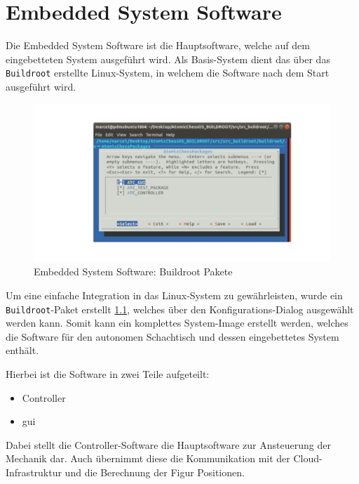 \hypertarget{embedded-system-software}{%
\chapter{Embedded System Software}\label{embedded-system-software}}

Die Embedded System Software ist die Hauptsoftware, welche auf dem
eingebetteten System ausgeführt wird. Als Basis-System dient das über
das \passthrough{\lstinline!Buildroot!} erstellte Linux-System, in
welchem die Software nach dem Start ausgeführt wird.

\begin{figure}
\centering
\includegraphics{images/buildroot_packages_1.png}
\caption{Embedded System Software: Buildroot Pakete
\label{buildroot_packages_1}}
\end{figure}

Um eine einfache Integration in das Linux-System zu gewährleisten, wurde
ein \passthrough{\lstinline!Buildroot!}-Paket erstellt
\ref{buildroot_packages_1}, welches über den Konfigurations-Dialog
ausgewählt werden kann. Somit kann ein komplettes System-Image erstellt
werden, welches die Software für den autonomen Schachtisch und dessen
eingebettetes System enthält.

Hierbei ist die Software in zwei Teile aufgeteilt:

\begin{itemize}
\tightlist
\item
  Controller
\item
  \gls{gui}
\end{itemize}

Dabei stellt die Controller-Software die Hauptsoftware zur Ansteuerung
der Mechanik dar. Auch übernimmt diese die Kommunikation mit der
Cloud-Infrastruktur und die Berechnung der Figur Positionen.

